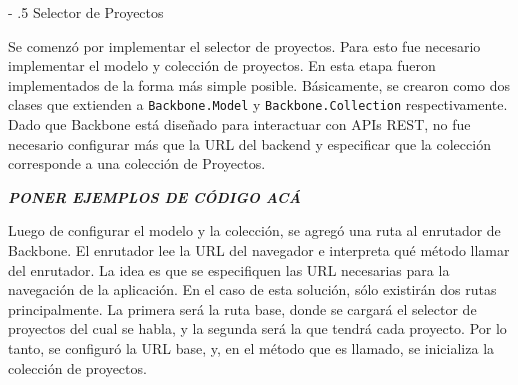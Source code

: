 \documentclass[12pt,titlepage,]{article}
\makeatletter
\newenvironment{Shaded}{}{}
\newcommand{\KeywordTok}[1]{\textcolor[rgb]{0.00,0.44,0.13}{\textbf{{#1}}}}
\newcommand{\DataTypeTok}[1]{\textcolor[rgb]{0.56,0.13,0.00}{{#1}}}
\newcommand{\CharTok}[1]{\textcolor[rgb]{0.25,0.44,0.63}{{#1}}}
\newcommand{\StringTok}[1]{\textcolor[rgb]{0.25,0.44,0.63}{{#1}}}
\newcommand{\CommentTok}[1]{\textcolor[rgb]{0.38,0.63,0.69}{\textit{{#1}}}}
\newcommand{\OtherTok}[1]{\textcolor[rgb]{0.00,0.44,0.13}{{#1}}}
\newcommand{\FunctionTok}[1]{\textcolor[rgb]{0.02,0.16,0.49}{{#1}}}
\newcommand{\NormalTok}[1]{{#1}}
\renewcommand\paragraph{%
   \@startsection{paragraph}{4}{0mm}%
      {-\baselineskip}%
      {.5\baselineskip}%
      {\normalfont\normalsize\bfseries}}
\makeatother
\begin{document}
\paragraph{Selector de Proyectos}

Se comenzó por implementar el selector de proyectos. Para esto fue
necesario implementar el modelo y colección de proyectos. En esta etapa
fueron implementados de la forma más simple posible. Básicamente, se
crearon como dos clases que extienden a \texttt{Backbone.Model} y
\texttt{Backbone.Collection} respectivamente. Dado que Backbone está
diseñado para interactuar con APIs REST, no fue necesario configurar más
que la URL del backend y especificar que la colección corresponde a una
colección de Proyectos.

\textbf{\emph{PONER EJEMPLOS DE CÓDIGO ACÁ}}

Luego de configurar el modelo y la colección, se agregó una ruta al
enrutador de Backbone. El enrutador lee la URL del navegador e
interpreta qué método llamar del enrutador. La idea es que se
especifiquen las URL necesarias para la navegación de la aplicación. En
el caso de esta solución, sólo existirán dos rutas principalmente. La
primera será la ruta base, donde se cargará el selector de proyectos del
cual se habla, y la segunda será la que tendrá cada proyecto. Por lo
tanto, se configuró la URL base, y, en el método que es llamado, se
inicializa la colección de proyectos.

\begin{Shaded}
\end{Shaded}
\end{document}
